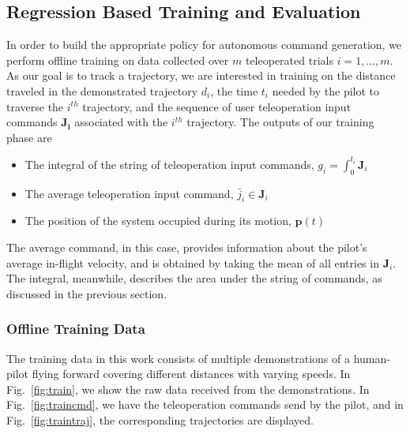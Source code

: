 \documentclass[letterpaper, 10 pt, conference]{ieeeconf}  %
\newcommand\NB[1]{$\spadesuit$\footnote{NB: #1}}
\begin{document}
\subsection{Regression Based Training and Evaluation} \label{sec:train}
In order to build the appropriate policy for autonomous command generation, we perform offline training on data collected over $m$ teleoperated trials $i=1,\ldots,m$. As our goal is to track a trajectory, we are interested in training on the distance traveled in the demonstrated trajectory $d_i$, the time $t_i$ needed by the pilot to traverse the $i^{th}$ trajectory, and the sequence of user teleoperation input commands $\bm{J_i}$ associated with the $i^{th}$ trajectory.
The outputs of our training phase are \begin{itemize} %
    \item The integral of the string of teleoperation input commands, $g_i = \int_0^{t_i}\bm{J}_i$
    \item The average teleoperation input command, $\bar{j}_i \in \bm{J}_i$
    \item The position of the system occupied during its motion, $\bm{p}(t)$
\end{itemize}
The average command, in this case, provides information about the pilot's average in-flight velocity, and is obtained by taking the mean of all entries in $\bm{J}_i$. The integral, meanwhile, describes the area under the string of commands, as discussed in the previous section.

\subsubsection{Offline Training Data}

The training data in this work consists of multiple demonstrations of a human-pilot flying forward covering different distances with varying speeds.
In Fig.~\ref{fig:train}, we show the raw data received from the demonstrations. In Fig.~\ref{fig:traincmd}, we have the teleoperation commands send by the pilot, and in Fig.~\ref{fig:traintraj}, the corresponding trajectories are displayed.
\end{document}
